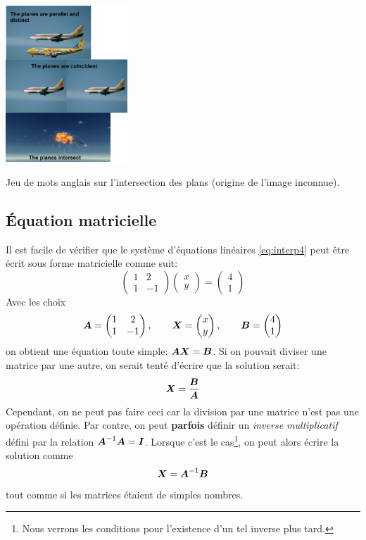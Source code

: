 %
\begin{marginfigure}
\includegraphics[width=1.8in]{images/plane_intersect.png}
\caption{Jeu de mots anglais sur l'intersection des plans (origine de l'image inconnue).}
\end{marginfigure}
%

%
\subsection{Équation matricielle} 
Il est facile de vérifier que le système d'équations linéaires \eqref{eq:interp4} peut être écrit sous
forme matricielle comme suit:
\[
\begin{pmatrix}
1 & 2 \\
1 & -1
\end{pmatrix}
\begin{pmatrix}
x \\ y
\end{pmatrix}
=
\begin{pmatrix}
4 \\
1
\end{pmatrix}
\]
Avec les choix
\[
\boldsymbol{A} = \begin{pmatrix}
1 & 2 \\
1 & -1
\end{pmatrix}, \qquad \boldsymbol{X}=
\begin{pmatrix}
x \\ y
\end{pmatrix}
, \qquad
\boldsymbol{B} = 
\begin{pmatrix}
4 \\
1
\end{pmatrix}
\]
on obtient une équation toute simple: $\boldsymbol{A} \boldsymbol{X} = \boldsymbol{B}$.  Si on pouvait diviser une matrice par une autre, on serait tenté d'écrire que la solution serait:
\[
\boldsymbol{X} = \frac{\boldsymbol{B}}{\boldsymbol{A}}
\]
Cependant, on ne peut pas faire ceci car la division par une matrice n'est pas une opération définie.
Par contre, on peut \textbf{parfois} définir un \textit{inverse multiplicatif} défini par la relation
$\boldsymbol{A}^{-1}\boldsymbol{A}=\boldsymbol{I}$. Lorsque c'est le cas\footnote{Nous verrons les conditions pour l'existence d'un
tel inverse plus tard.}, on peut alors écrire la solution comme
\[
\boldsymbol{X} = \boldsymbol{A}^{-1}\boldsymbol{B}
\]
tout comme si les matrices étaient de simples nombres.

